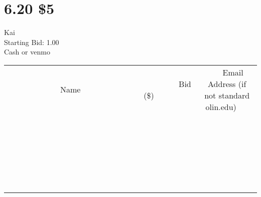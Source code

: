 \documentclass[11pt]{article}
\begin{document}
					\section*{6.20 \$5}
					Kai \\
					Starting Bid: 1.00 \\
					Cash or venmo \\
					[6ex]
					\begin{tabular}{c c c}
						~~~~~~~~~~~~~Name~~~~~~~~~~~~~ & ~~~~~~~~~Bid (\$)~~~~~~~~~ & ~~~Email Address (if not standard olin.edu)~~~ \\
				
 & & \\
\hline
 & & \\
\hline
 & & \\
\hline
 & & \\
\hline
 & & \\
\hline
 & & \\
\hline
 & & \\
\hline
 & & \\
\hline
 & & \\
\hline
 & & \\
\hline
 & & \\
\hline
 & & \\
\hline
 & & \\
\hline
 & & \\
\hline
 & & \\
\hline
 & & \\
\hline
 & & \\
\hline
 & & \\
\hline
 & & \\
\hline
 & & \\
\hline
 & & \\
\hline
 & & \\
\hline
 & & \\
\hline
 & & \\
\hline
 & & \\
\hline
 & & \\
\hline
					\end{tabular}
					\clearpage
				
\end{document}
